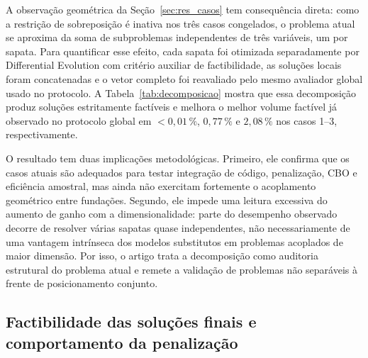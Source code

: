 A observação geométrica da Seção~\ref{sec:res_casos} tem consequência direta: como a restrição de sobreposição é inativa nos três casos congelados, o problema atual se aproxima da soma de subproblemas independentes de três variáveis, um por sapata. Para quantificar esse efeito, cada sapata foi otimizada separadamente por Differential Evolution com critério auxiliar de factibilidade, as soluções locais foram concatenadas e o vetor completo foi reavaliado pelo mesmo avaliador global usado no protocolo. A Tabela~\ref{tab:decomposicao} mostra que essa decomposição produz soluções estritamente factíveis e melhora o melhor volume factível já observado no protocolo global em $<0{,}01\,\%$, $0{,}77\,\%$ e $2{,}08\,\%$ nos casos 1--3, respectivamente.



O resultado tem duas implicações metodológicas. Primeiro, ele confirma que os casos atuais são adequados para testar integração de código, penalização, CBO e eficiência amostral, mas ainda não exercitam fortemente o acoplamento geométrico entre fundações. Segundo, ele impede uma leitura excessiva do aumento de ganho com a dimensionalidade: parte do desempenho observado decorre de resolver várias sapatas quase independentes, não necessariamente de uma vantagem intrínseca dos modelos substitutos em problemas acoplados de maior dimensão. Por isso, o artigo trata a decomposição como auditoria estrutural do problema atual e remete a validação de problemas não separáveis à frente de posicionamento conjunto.

\subsection{Factibilidade das soluções finais e comportamento da penalização}
\label{sec:res_factibilidade}

